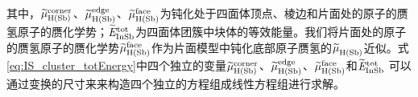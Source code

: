 其中，$\it \widetilde{\mu}_{\rm H\left(Sb\right)}^{\rm corner} \it$、$\it \widetilde{\mu}_{\rm H\left(Sb\right)}^{\rm edge} \it$、$\it \widetilde{\mu}_{\rm H\left(Sb\right)}^{\rm face} \it$为钝化处于四面体顶点、棱边和片面处的原子的赝氢原子的赝化学势；$\it \widetilde{E}_{\rm InSb}^{\rm tot} \it$为四面体团簇中块体的等效能量。我们将片面处的原子的赝氢原子的赝化学势$\it \widetilde{\mu}_{\rm H\left(Sb\right)}^{\rm face} \it$作为片面模型中钝化底部原子赝氢的$\it \widetilde{\mu}_{\rm H\left(Sb\right)}^{\rm } \it$近似。式\ref{eq:IS_cluster_totEnergy}中四个独立的变量$\it \widetilde{\mu}_{\rm H\left(Sb\right)}^{\rm corner} \it$、$\it \widetilde{\mu}_{\rm H\left(Sb\right)}^{\rm edge} \it$、$\it \widetilde{\mu}_{\rm H\left(Sb\right)}^{\rm face} \it$和$\it \widetilde{E}_{\rm InSb}^{\rm tot} \it$
可以通过变换的尺寸来来构造四个独立的方程组成线性方程组进行求解。

\begin{figure}[htb]
    \\[-0.5ex]
\end{figure}
